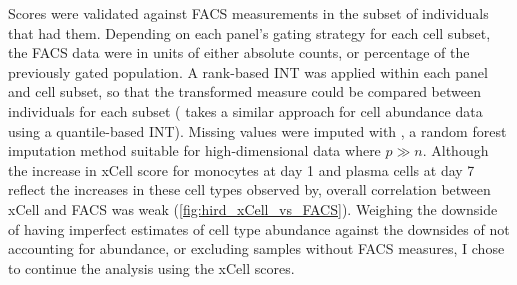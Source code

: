 Scores were validated against \gls{FACS} measurements in the subset of individuals that had them.
Depending on each panel's gating strategy for each cell subset, the \gls{FACS} data were in units of either absolute counts, or percentage of the previously gated population.
A rank-based \gls{INT} was applied within each panel and cell subset, so that the transformed measure could be compared between individuals for each subset (\autocite{astle2016AllelicLandscapeHuman} takes a similar approach for cell abundance data using a quantile-based \gls{INT}).
%
Missing values were imputed with , a random forest imputation method suitable for high-dimensional data where $p \gg n$.
Although the increase in xCell score for monocytes at day 1 and plasma cells at day 7 reflect the increases in these cell types observed by\autocite{sobolev2016AdjuvantedInfluenzaH1N1Vaccination}, overall correlation between xCell and \gls{FACS} was weak (\cref{fig:hird_xCell_vs_FACS}).
Weighing the downside of having imperfect estimates of cell type abundance against the downsides of not accounting for abundance, or excluding samples without \gls{FACS} measures, I chose to continue the analysis using the xCell scores.

